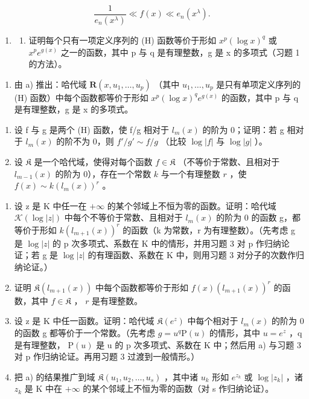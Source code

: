 \[
\frac {1}{e _ {n} (x ^ {\lambda})} \ll f (x) \ll e _ {n} (x ^ {\lambda}).
\]

\begin{enumerate}
\def\labelenumi{\arabic{enumi})}
\setcounter{enumi}{1}
\tightlist
\item
  \begin{enumerate}
  \def\labelenumii{\alph{enumii})}
  \tightlist
  \item
    证明每个只有一项定义序列的 (H) 函数等价于形如 \(x^{p}(\log x)^{q}\) 或 \(x^{p}e^{g(x)}\) 之一的函数，其中 p 与 q 是有理整数，g 是 x 的多项式（习题 1 的方法）。
  \end{enumerate}
\end{enumerate}

\begin{enumerate}
\def\labelenumi{\alph{enumi})}
\setcounter{enumi}{1}
\tightlist
\item
  由 a) 推出：哈代域 \(\mathbf{R}(x,u_{1},\ldots,u_{p})\) （其中 \(u_{1},\ldots,u_{p}\) 是只有单项定义序列的 (H) 函数）中每个函数都等价于形如 \(x^{p}(\log x)^{q}e^{g(x)}\) 的函数，其中 p 与 q 是有理整数，g 是 x 的多项式。
\end{enumerate}

\begin{enumerate}
\def\labelenumi{\arabic{enumi})}
\setcounter{enumi}{2}
\item
  设 f 与 g 是两个 (H) 函数，使 f/g 相对于 \(l_{m}(x)\) 的阶为 0；证明：若 g 相对于 \(l_{m}(x)\) 的阶不为 0，则 \(f'/g' \sim f/g\) （比较 \(\log |f|\) 与 \(\log |g|\) ）。
\item
  设 \(\mathfrak{K}\) 是一个哈代域，使得对每个函数 \(f\in \mathfrak{K}\) （不等价于常数、且相对于 \(l_{m - 1}(x)\) 的阶为 0），存在一个常数 \(k\) 与一个有理整数 \(r\) ，使 \(f(x)\sim k(l_m(x))^r\) 。
\end{enumerate}

\begin{enumerate}
\def\labelenumi{\alph{enumi})}
\item
  设 z 是 K 中任一在 \(+\infty\) 的某个邻域上不恒为零的函数。证明：哈代域 \(\mathcal{K}(\log|z|)\) 中每个不等价于常数、且相对于 \(l_{m}(x)\) 的阶为 0 的函数 g，都等价于形如 \(k(l_{m+1}(x))^{r}\) 的函数（k 为常数，r 为有理整数）。（先考虑 g 是 \(\log|z|\) 的 p 次多项式、系数在 K 中的情形，并用习题 3 对 p 作归纳论证；若 g 是 \(\log|z|\) 的有理函数、系数在 K 中，则用习题 3 对分子的次数作归纳论证。）
\item
  证明 \(\mathfrak{K}(l_{m+1}(x))\) 中每个函数都等价于形如 \(f(x)(l_{m+1}(x))^r\) 的函数，其中 \(f \in \mathfrak{K}\) ， \(r\) 是有理整数。
\item
  设 z 是 K 中任一函数。证明：哈代域 \(\mathfrak{K}(e^{z})\) 中每个相对于 \(l_{m}(x)\) 的阶为 0 的函数 g 都等价于一个常数。（先考虑 \(g = u^{q} \mathrm{P}(u)\) 的情形，其中 \(u = e^{z}\) ，q 是有理整数， \(\mathrm{P}(u)\) 是 u 的 p 次多项式、系数在 K 中；然后用 a) 与习题 3 对 p 作归纳论证。再用习题 3 过渡到一般情形。）
\item
  把 a) 的结果推广到域 \(\mathfrak{K}(u_{1}, u_{2}, \ldots, u_{s})\) ，其中诸 \(u_{k}\) 形如 \(e^{z_{k}}\) 或 \(\log |z_{k}|\) ，诸 \(z_{k}\) 是 K 中在 \(+\infty\) 的某个邻域上不恒为零的函数（对 s 作归纳论证）。
\end{enumerate}

